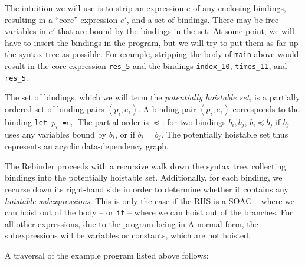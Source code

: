 The intuition we will use is to strip an expression $e$ of any
enclosing bindings, resulting in a ``core'' expression $e'$, and a set
of bindings.  There may be free variables in $e'$ that are bound by
the bindings in the set.  At some point, we will have to insert the
bindings in the program, but we will try to put them as far up the
syntax tree as possible.  For example, stripping the body of
\texttt{main} above would result in the core expression
\texttt{res\_5} and the bindings \texttt{index\_10},
\texttt{times\_11}, and \texttt{res\_5}.

The set of bindings, which we will term the \textit{potentially
  hoistable set}, is a partially ordered set of binding pairs
$(p_{i},e_{i})$.  A binding pair $(p_{i},e_{i})$ corresponds to the
\LO{} binding \texttt{let~$p_{i}$~=$e_{i}$}.  The partial order is
$\preceq$: for two bindings $b_{i}, b_{j}$, $b_{i} \preceq b_{j}$ if
$b_{j}$ uses any variables bound by $b_{i}$, or if $b_{i} = b_{j}$.
The potentially hoistable set thus represents an acyclic
data-dependency graph.

The Rebinder proceeds with a recursive walk down the syntax tree,
collecting bindings into the potentially hoistable set.  Additionally,
for each binding, we recurse down its right-hand side in order to
determine whether it contains any \textit{hoistable subexpressions}.
This is only the case if the RHS is a SOAC -- where we can hoist out
of the body -- or \texttt{if} -- where we can hoist out of the
branches.  For all other expressions, due to the program being in
A-normal form, the subexpressions will be variables or constants,
which are not hoisted.

A traversal of the example program listed above follows:

